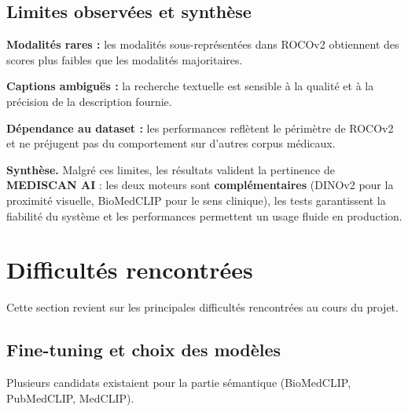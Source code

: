 \documentclass[12pt,a4paper]{article}
\newcommand{\NewMajorPart}{\clearpage}
\begin{document}
\vspace{0.7cm}

\subsection{Limites observées et synthèse}

\vspace{0.2cm}
\begin{sq}
  \item \textbf{Modalités rares :} les modalités sous-représentées dans ROCOv2 obtiennent des scores plus faibles que les modalités majoritaires.
  \item \textbf{Captions ambiguës :} la recherche textuelle est sensible à la qualité et à la précision de la description fournie.
  \item \textbf{Dépendance au dataset :} les performances reflètent le périmètre de ROCOv2 et ne préjugent pas du comportement sur d'autres corpus médicaux.
\end{sq}

\vspace{0.3cm}
\noindent\textbf{Synthèse.}
Malgré ces limites, les résultats valident la pertinence de \textbf{MEDISCAN AI} :
les deux moteurs sont \textbf{complémentaires} (DINOv2 pour la proximité visuelle,
BioMedCLIP pour le sens clinique), les tests garantissent la fiabilité du système
et les performances permettent un usage fluide en production.

\NewMajorPart
\section{Difficultés rencontrées}

\vspace{0.2cm}
Cette section revient sur les principales difficultés rencontrées au cours du projet.

\vspace{0.5cm}

\subsection{Fine-tuning et choix des modèles}

\vspace{0.15cm}
Plusieurs candidats existaient pour la partie sémantique (BioMedCLIP, PubMedCLIP, MedCLIP).
\end{document}
